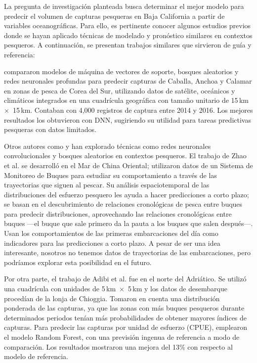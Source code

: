 La pregunta de investigación planteada busca determinar el mejor modelo para predecir el volumen de capturas pesqueras en Baja California a partir de variables oceanográficas. Para ello, es pertinente conocer algunos estudios previos donde se hayan aplicado técnicas de modelado y pronóstico similares en contextos pesqueros. A continuación, se presentan trabajos similares que sirvieron de guía y referencia:


\citet{yoon2020} compararon modelos de máquina de vectores de soporte, bosques aleatorios y redes neuronales profundas para predecir capturas de Caballa, Anchoa y Calamar en zonas de pesca de Corea del Sur, utilizando datos de satélite, oceánicos y climáticos integrados en una cuadrícula geográfica con tamaño unitario de 15\,km~$\times$~15\,km. Contaban con 4,000 registros de captura entre 2014 y 2016. Los mejores resultados los obtuvieron con DNN, sugiriendo su utilidad para tareas predictivas pesqueras con datos limitados.


Otros autores como \citet{zhao2021} y \citet{adibi2020} han explorado técnicas como redes neuronales convolucionales y bosques aleatorios en contextos pesqueros. El trabajo de Zhao et al. se desarrolló en el Mar de China Oriental; utilizaron datos de un Sistema de Monitoreo de Buques para estudiar su comportamiento a través de las trayectorias que siguen al pescar. Su análisis espaciotemporal de las distribuciones del esfuerzo pesquero les ayuda a hacer predicciones a corto plazo; se basan en el descubrimiento de relaciones cronológicas de pesca entre buques para predecir distribuciones, aprovechando las relaciones cronológicas entre buques —el buque que sale primero da la pauta a los buques que salen después—. Usan los comportamientos de las primeras embarcaciones del día como indicadores para las predicciones a corto plazo. A pesar de ser una idea interesante, nosotros no tenemos datos de trayectorias de las embarcaciones, pero podríamos explorar esta posibilidad en el futuro. 

Por otra parte, el trabajo de Adibi et al. fue en el norte del Adriático. Se utilizó una cuadrícula con unidades de 5\,km~$\times$~5\,km y los datos de desembarque procedían de la lonja de Chioggia. Tomaron en cuenta una distribución ponderada de las capturas, ya que las zonas con más buques pesqueros durante determinados periodos tenían más probabilidades de obtener mayores índices de capturas. Para predecir las capturas por unidad de esfuerzo (CPUE), emplearon el modelo Random Forest, con una previsión ingenua de referencia a modo de comparación. Los resultados mostraron una mejora del 13\% con respecto al modelo de referencia.


